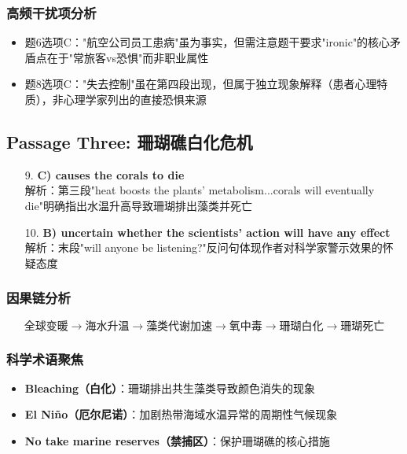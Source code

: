 \documentclass{article}
\begin{document}
\subsubsection*{高频干扰项分析}
\begin{itemize}
    \item 题6选项C："航空公司员工患病"虽为事实，但需注意题干要求"ironic"的核心矛盾点在于"常旅客vs恐惧"而非职业属性
    \item 题8选项C："失去控制"虽在第四段出现，但属于独立现象解释（患者心理特质），非心理学家列出的直接恐惧来源
\end{itemize}

\subsection*{Passage Three: 珊瑚礁白化危机}
\begin{enumerate}
    \item[9.] \textbf{C) causes the corals to die} \\ 
    解析：第三段"heat boosts the plants' metabolism...corals will eventually die"明确指出水温升高导致珊瑚排出藻类并死亡
    
    \item[10.] \textbf{B) uncertain whether the scientists' action will have any effect} \\ 
    解析：末段"will anyone be listening?"反问句体现作者对科学家警示效果的怀疑态度
\end{enumerate}

\subsubsection*{因果链分析}
\[
\text{全球变暖} \rightarrow 
\text{海水升温} \rightarrow 
\text{藻类代谢加速} \rightarrow 
\text{氧中毒} \rightarrow 
\text{珊瑚白化} \rightarrow 
\text{珊瑚死亡}
\]

\subsubsection*{科学术语聚焦}
\begin{itemize}
    \item \textbf{Bleaching（白化）}：珊瑚排出共生藻类导致颜色消失的现象
    \item \textbf{El Niño（厄尔尼诺）}：加剧热带海域水温异常的周期性气候现象
    \item \textbf{No take marine reserves（禁捕区）}：保护珊瑚礁的核心措施
\end{itemize}
\end{document}

